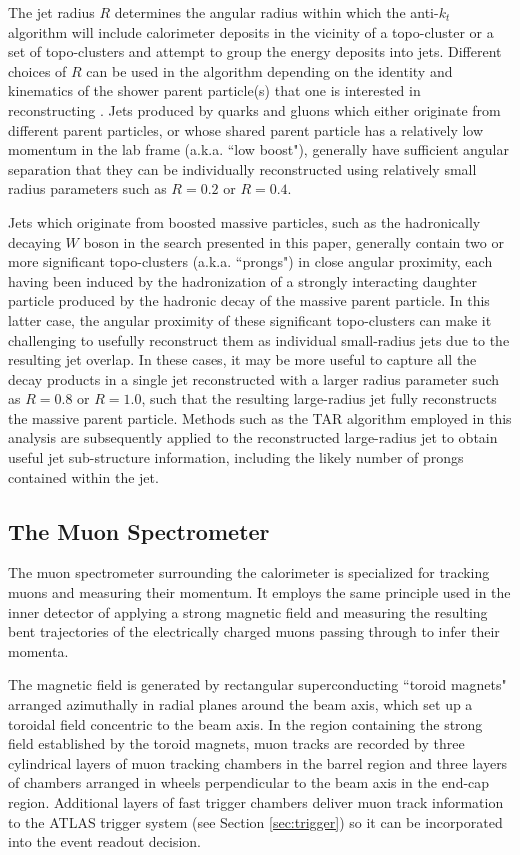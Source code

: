 The jet radius $R$ determines the angular radius within which the anti-$k_t$ algorithm will include calorimeter deposits in the vicinity of a topo-cluster or a set of topo-clusters and attempt to group the energy deposits into jets. Different choices of $R$ can be used in the algorithm depending on the identity and kinematics of the shower parent particle(s) that one is interested in reconstructing \cite{jet_reco}. Jets produced by quarks and gluons which either originate from different parent particles, or whose shared parent particle has a relatively low momentum in the lab frame (a.k.a. ``low boost"), generally have sufficient angular separation that they can be individually reconstructed using relatively small radius parameters such as $R=0.2$ or $R=0.4$. 

Jets which originate from boosted massive particles, such as the hadronically decaying $W$ boson in the search presented in this paper, generally contain two or more significant topo-clusters (a.k.a. ``prongs") in close angular proximity, each having been induced by the hadronization of a strongly interacting daughter particle produced by the hadronic decay of the massive parent particle. In this latter case, the angular proximity of these significant topo-clusters can make it challenging to usefully reconstruct them as individual small-radius jets due to the resulting jet overlap. In these cases, it may be more useful to capture all the decay products in a single jet reconstructed with a larger radius parameter such as $R=0.8$ or $R=1.0$, such that the resulting large-radius jet fully reconstructs the massive parent particle. Methods such as the TAR algorithm \cite{TAR_algo} employed in this analysis are subsequently applied to the reconstructed large-radius jet to obtain useful jet sub-structure information, including the likely number of prongs contained within the jet.

\subsection{The Muon Spectrometer}

The muon spectrometer \cite{atlas} surrounding the calorimeter is specialized for tracking muons and measuring their momentum. It employs the same principle used in the inner detector of applying a strong magnetic field and measuring the resulting bent trajectories of the electrically charged muons passing through to infer their momenta. 

The magnetic field is generated by rectangular superconducting ``toroid magnets" arranged azimuthally in radial planes around the beam axis, which set up a toroidal field concentric to the beam axis. In the region containing the strong field established by the toroid magnets, muon tracks are recorded by three cylindrical layers of muon tracking chambers in the barrel region and three layers of chambers arranged in wheels perpendicular to the beam axis in the end-cap region. Additional layers of fast trigger chambers deliver muon track information to the ATLAS trigger system (see Section \ref{sec:trigger}) so it can be incorporated into the event readout decision. 

